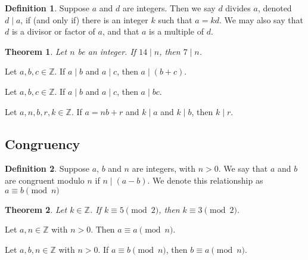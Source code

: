 \documentclass{article}
\newtheorem*{theorem*}{Theorem}
\theoremstyle{definition}
\newtheorem*{definition*}{Definition}
\newenvironment{manualtheorem}[1]{%
  \renewcommand{\thetheorem}{#1}%
  \theorem%
}{%
  \endtheorem%
}
\begin{document}
\begin{definition*}
	Suppose $a$ and $d$ are integers. Then we say $d$ divides $a$, denoted $d \mid a$, if (and only if) there is an integer $k$ such that $a = kd$. We may also say that $d$ is a divisor or factor of $a$, and that $a$ is a multiple of $d$.
\end{definition*}



\begin{theorem*}
	Let $n$ be an integer. If $14 \mid n$, then $7 \mid n$.
\end{theorem*}

\begin{manualtheorem}{1.1}
	Let $a, b, c \in \mathbb{Z}$. If $a \mid b$ and $a \mid c$, then $a \mid (b + c)$.
\end{manualtheorem}

\begin{manualtheorem}{1.3}
	Let $a, b, c \in \mathbb{Z}$. If $a \mid b$ and $a \mid c$, then $a \mid bc$.
\end{manualtheorem}

\begin{manualtheorem}{1.32}
	Let $a, n, b, r, k \in \mathbb{Z}$. If $a = nb + r$ and $k \mid a$ and $k \mid b$, then $k \mid r$.
\end{manualtheorem}


\subsection{Congruency}
\begin{definition*}
	Suppose $a$, $b$ and $n$ are integers, with $n > 0$. We say that $a$ and $b$ are congruent modulo $n$ if $n \mid (a - b)$. We denote this relationship as
	\(a \equiv b \pmod{n}\)
\end{definition*}



\begin{theorem*}
	Let $k \in \mathbb{Z}$. If $k \equiv 5 \pmod{2}$, then $k \equiv 3 \pmod{2}$.
\end{theorem*}

\begin{manualtheorem}{1.9}
	Let $a, n \in \mathbb{Z}$ with $n > 0$. Then $a \equiv a \pmod{n}$.
\end{manualtheorem}

\begin{manualtheorem}{1.10}
	Let $a, b, n \in \mathbb{Z}$ with $n > 0$. If $a \equiv b \pmod{n}$, then $b \equiv a \pmod{n}$.
\end{manualtheorem}
\end{document}
